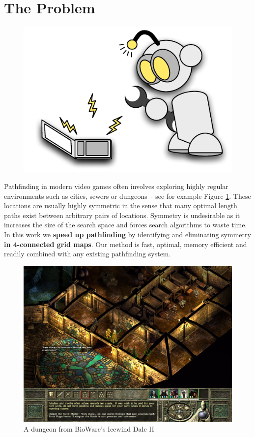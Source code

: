 \section{The Problem}
 \begin{figure}
\vspace{-3em}
		\includegraphics[width=0.30\columnwidth]{diagrams/robot_mechanic.pdf}
 \end{figure}

Pathfinding in modern video games often involves exploring highly regular 
environments such as cities, sewers or dungeons -- see for example
Figure \ref{fig:iw2}.
These locations are usually highly symmetric in the sense that many optimal 
length paths exist between arbitrary pairs of locations.
Symmetry is undesirable as it increases the size of the search space and forces
search algorithms to waste time.
\newline \newline
In this work we \textbf{speed up pathfinding} by identifying and eliminating
symmetry \textbf{in 4-connected grid maps}.
Our method is fast, optimal, memory efficient and readily combined with any
existing pathfinding system.

 \begin{figure}[h]
	\vspace{1em}
	\centering
	\label{fig:iw2}
		\includegraphics[width=\columnwidth]{diagrams/iwdale.jpg}
 \caption{A dungeon from BioWare's Icewind Dale II}
 \end{figure}

